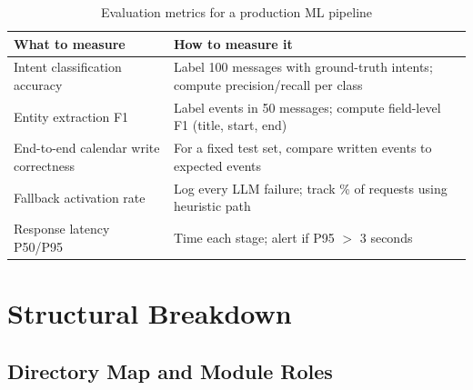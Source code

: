 \documentclass[12pt, a4paper]{article}
\begin{document}
\begin{table}[htbp]
\centering
\renewcommand{\arraystretch}{1.4}
\begin{tabularx}{\textwidth}{L{3.5cm} X}
\toprule
\textbf{What to measure} & \textbf{How to measure it} \\
\midrule
Intent classification accuracy
  & Label 100 messages with ground-truth intents; compute precision/recall per class \\
Entity extraction F1
  & Label events in 50 messages; compute field-level F1 (title, start, end) \\
End-to-end calendar write correctness
  & For a fixed test set, compare written events to expected events \\
Fallback activation rate
  & Log every LLM failure; track \% of requests using heuristic path \\
Response latency P50/P95
  & Time each stage; alert if P95 $>$ 3 seconds \\
\bottomrule
\end{tabularx}
\caption{Evaluation metrics for a production ML pipeline}
\end{table}


\section{Structural Breakdown}

\subsection{Directory Map and Module Roles}
\end{document}
